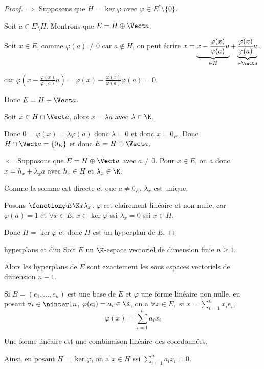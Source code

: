 \begin{proof}
    $\Rightarrow$ Supposons que $H = \ker \varphi$ avec $\varphi \in E^* \setminus \{0\}$.

    Soit $a \in E \setminus H$. Montrons que $E = H \oplus \Vect a$. 

    Soit $x \in E$, comme $\varphi(a) \neq 0$ car $a \notin H$, on peut écrire 
    $x = \underbrace{ x - \frac{\varphi(x)}{\varphi(a)} a}_{\in H} + \underbrace{\frac{\varphi(x)}{\varphi(a)} a}_{\in \Vect a}$.

    car $\varphi(x - \frac{\varphi(x) }{\varphi(a)} a) = \varphi(x) - \frac{\varphi(x)}{\varphi(a)} \varphi(a) = 0$.

    Donc $E = H + \Vect a$.

    Soit $x \in H \cap \Vect a$, alors $x = \lambda a$ avec $\lambda \in \K$.

    Donc $0 = \varphi(x) = \lambda \varphi(a)$ donc $\lambda = 0 $ et donc $x = 0_E$.
    Donc $H \cap \Vect a = \{0_E\}$ et donc $E = H \oplus \Vect a$.

    \lvspace $\Leftarrow$ Supposons que $E = H \oplus \Vect a$ avec $a \neq 0$. Pour $x \in E$, on a donc 
    $x = h_x + \lambda_x a$ avec $h_x \in H$ et $\lambda_x \in \K$.

    Comme la somme est directe et que $a \neq 0_E$, $\lambda_x$ est unique. 

    Posons $\fonction \varphi E \K x {\lambda_x}$. $\varphi$ est clairement linéaire et non nulle, 
    car $\varphi(a) = 1$ et $\forall x \in E, \, x \in \ker \varphi$ ssi $\lambda_x = 0$ ssi $x \in H$. 

    Donc $H = \ker \varphi$ et donc $H$ est un hyperplan de $E$.
\end{proof}

\begin{corollaire}{hyperplans et dim}{}
    Soit $E$ un $\K$-espace vectoriel de dimension finie $n \geqslant 1$. 

    Alors les hyperplans de $E$ sont exactement les sous espaces vectoriels de dimension $n - 1$.

    Si $B = (e_1, \dots, e_n)$ est une base de $E$ et $\varphi$ une forme linéaire non nulle, en posant 
    $\forall i \in \ninter 1 n$, $\varphi(e_i) = a_i \in \K$, on a 
    $\forall x \in E, $ si $x = \sum_{i=1}^n x_i e_i$,
    $$\varphi(x) = \sum_{i=1}^n a_i x_i$$

    Une forme linéaire est une combinaison linéaire des coordonnées. 

    Ainsi, en posant $H = \ker \varphi$, on a $x \in H$ ssi $\sum_{i=1}^n a_i x_i = 0$.
\end{corollaire}

